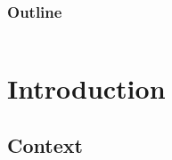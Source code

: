\documentclass[10pt,table,dvipsnames,compress]{beamer}
\newif\ifplacelogo %
\begin{document}

\placelogotrue
\begin{frame}
  \frametitle{Outline}
  \begin{columns}[c]
    \begin{column}{0.5\textwidth}
      \tableofcontents[sections=1]
      \vspace{0.5cm}
      \tableofcontents[sections=2]
      \vspace{0.5cm}
      \tableofcontents[sections=3]
    \end{column}
    \begin{column}{0.5\textwidth}
        \tableofcontents[sections=4]
        \vspace{0.5cm}
        \tableofcontents[sections=5]
    \end{column}
  \end{columns}
\end{frame}
\placelogofalse

\section{Introduction}
\label{sec:org54c70f7}

\subsection{Context}
\label{sec:org0429c6f}
\end{document}
